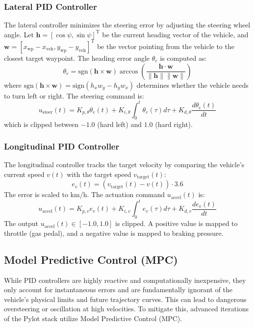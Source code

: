 \documentclass[11pt,a4paper]{report}
\begin{document}
\subsubsection{Lateral PID Controller}
The lateral controller minimizes the steering error by adjusting the steering wheel angle. Let $\mathbf{h} = [\cos\psi, \sin\psi]^{\text{T}}$ be the current heading vector of the vehicle, and $\mathbf{w} = [x_{\text{wp}} - x_{\text{veh}}, y_{\text{wp}} - y_{\text{veh}}]^{\text{T}}$ be the vector pointing from the vehicle to the closest target waypoint. The heading error angle $\theta_e$ is computed as:
\begin{equation}
    \theta_e = \text{sgn}(\mathbf{h} \times \mathbf{w}) \arccos \left( \frac{\mathbf{h} \cdot \mathbf{w}}{\|\mathbf{h}\| \|\mathbf{w}\|} \right)
\end{equation}
where $\text{sgn}(\mathbf{h} \times \mathbf{w}) = \text{sign}(h_x w_y - h_y w_x)$ determines whether the vehicle needs to turn left or right. The steering command is:
\begin{equation}
    u_{\text{steer}}(t) = K_{p,\theta} \theta_e(t) + K_{i,\theta} \int_0^t \theta_e(\tau) d\tau + K_{d,\theta} \frac{d\theta_e(t)}{dt}
\end{equation}
which is clipped between $-1.0$ (hard left) and $1.0$ (hard right).

\subsubsection{Longitudinal PID Controller}
The longitudinal controller tracks the target velocity by comparing the vehicle's current speed $v(t)$ with the target speed $v_{\text{target}}(t)$:
\begin{equation}
    e_v(t) = (v_{\text{target}}(t) - v(t)) \cdot 3.6
\end{equation}
The error is scaled to km/h. The actuation command $u_{\text{accel}}(t)$ is:
\begin{equation}
    u_{\text{accel}}(t) = K_{p,v} e_v(t) + K_{i,v} \int_0^t e_v(\tau) d\tau + K_{d,v} \frac{de_v(t)}{dt}
\end{equation}
The output $u_{\text{accel}}(t) \in [-1.0, 1.0]$ is clipped. A positive value is mapped to throttle (gas pedal), and a negative value is mapped to braking pressure.

\subsection{Model Predictive Control (MPC)}
While PID controllers are highly reactive and computationally inexpensive, they only account for instantaneous errors and are fundamentally ignorant of the vehicle's physical limits and future trajectory curves. This can lead to dangerous oversteering or oscillation at high velocities. To mitigate this, advanced iterations of the Pylot stack utilize Model Predictive Control (MPC).
\end{document}
